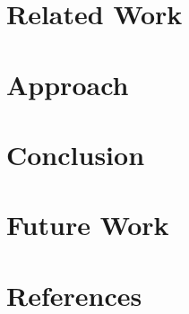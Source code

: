 \documentclass[a4paper,parskip=half]{scrartcl}
\newcommand{\msgpack}{{\small MessagePack}\xspace}
\begin{document}

\newpage

\newpage

\newpage

\newpage
\tableofcontents
\newpage

\section{Related Work}
\label{sec:relwork}
\section{Approach}
\label{sec:approach}



 
 

\section{Conclusion}
\label{sec:conclusion}
\section{Future Work}
\label{sec:future}
\newpage
\section*{References}
\renewcommand\refname{}


\newpage
\listoftodos[Notes] %
\end{document}
